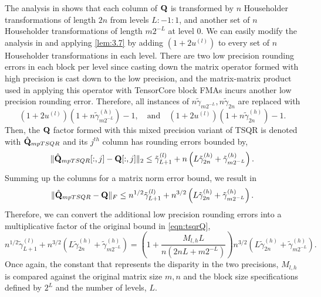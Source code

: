 The analysis in \cite{Mori2012} shows that each column of $\mathbf{Q}$ is transformed by $n$ Householder transformations of length $2n$ from levels $L:-1:1$, and another set of $n$ Householder transformations of length $m2^{-L}$ at level $0$.
We can easily modify the analysis in \cite{Mori2012} and applying \cref{lem:3.7} by adding $(1+2u^{(l)})$ to every set of $n$ Householder transformations in each level.
There are two low precision rounding errors in each block per level since casting down the matrix operator formed with high precision is cast down to the low precision, and the matrix-matrix product used in applying this operator with TensorCore block FMAs incurs another low precision rounding error. 
Therefore, all instances of $n\tilde{\gamma}_{m2^{-L}},n\tilde{\gamma}_{2n}$ are replaced with \[(1+2u^{(l)})(1+n\tilde{\gamma}_{m2^{-L}}^{(h)})-1,\quad\text{and}\quad (1+2u^{(l)})(1+n\tilde{\gamma}_{2n}^{(h)})-1.\]
Then, the $\mathbf{Q}$ factor formed with this mixed precision variant of TSQR is denoted with $\hat{\mathbf{Q}}_{mpTSQR}$ and its $j^{th}$ column has rounding errors bounded by,
\begin{equation}
\|\hat{\bb{Q}}_{mpTSQR}[:,j] - \bb{Q}[:,j]\|_2 \leq \tilde{\gamma}_{L+1}^{(l)}+n\left(L\tilde{\gamma}_{2n}^{(h)}+\tilde{\gamma}_{m2^{-L}}^{(h)}\right)\label{eqn:mpTSQR1}.
\end{equation}
Summing up the columns for a matrix norm error bound, we result in 
\begin{equation}
	\|\hat{\bb{Q}}_{mpTSQR} - \bb{Q}\|_F \leq n^{1/2}\tilde{\gamma}_{L+1}^{(l)}+n^{3/2}\left(L\tilde{\gamma}_{2n}^{(h)}+\tilde{\gamma}_{m2^{-L}}^{(h)}\right).\label{eqn:mpTSQR2}
\end{equation}
Therefore, we can convert the additional low precision rounding errors into a multiplicative factor of the original bound in \cref{eqn:tsqrQ},
\begin{equation}
	n^{1/2}\tilde{\gamma}_{L+1}^{(l)}+n^{3/2}\left(L\tilde{\gamma}_{2n}^{(h)}+\tilde{\gamma}_{m2^{-L}}^{(h)}\right) = (1+ \frac{M_{l,h}L}{n(2nL+m2^{-L})})n^{3/2}\left(L\tilde{\gamma}_{2n}^{(h)}+\tilde{\gamma}_{m2^{-L}}^{(h)}\right).
\end{equation}
Once again, the constant that represents the disparity in the two precisions, $M_{l,h}$ is compared against the original matrix size $m,n$ and the block size specifications defined by $2^{L}$ and the number of levels, $L$.
